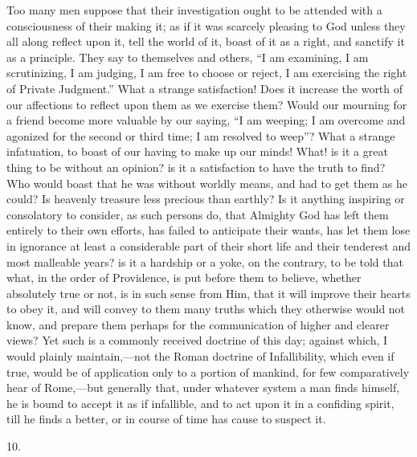 Too many men suppose that their investigation ought to be attended
with a consciousness of their making it; as if it was scarcely
pleasing to God unless they all along reflect upon it, tell the world
of it, boast of it as a right, and sanctify it as a principle. They
say to themselves and others, ``I am examining, I am scrutinizing,
I am judging, I am free to choose or reject, I am exercising the right
of Private Judgment.'' What a strange satisfaction! Does it
increase the worth of our affections to reflect upon them as we
exercise them? Would our mourning for a friend become more valuable by
our saying, ``I am weeping; I am overcome and agonized for the
second or third time; I am resolved to weep''? What a strange
infatuation, to boast of our having to make up our minds! What! is it
a great thing to be without an opinion? is it a satisfaction to have
the truth to find? Who would boast that he was without worldly means,
and had to get them as he could? Is heavenly treasure less precious
than earthly? Is it anything inspiring or consolatory to consider, as
such persons do, that Almighty God has left them entirely to their own
efforts, has failed to anticipate their wants, has let them lose in
ignorance at least a considerable part of their short life and their
tenderest and most malleable years? is it a hardship or a yoke, on the
contrary, to be told that what, in the order of Providence, is put
before them to believe, whether absolutely true or not, is in such
sense from Him, that it will improve their hearts to obey it, and will
convey to them many truths which they otherwise would not know, and
prepare them perhaps for the communication of higher and clearer
views? Yet such is a commonly received doctrine of this day; against
which, I would plainly maintain,—not the Roman doctrine of
Infallibility, which even if true, would be of application only to a
portion of mankind, for few comparatively hear of Rome,—but
generally that, under whatever system a man finds himself, he is bound
to accept it as if infallible, and to act upon it in a confiding
spirit, till he finds a better, or in course of time has cause to
suspect it.

10.

